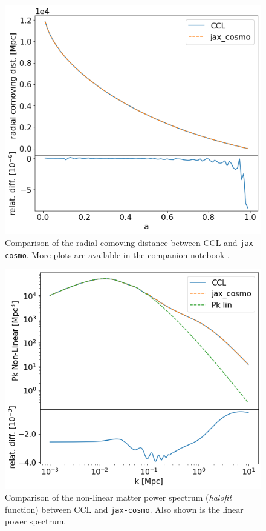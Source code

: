 \documentclass[twocolumn,twocolappendix,nofootinbib,iop]{openjournal}
\newcommand{\nblink}[1]{\href{https://github.com/DifferentiableUniverseInitiative/jax-cosmo-paper/blob/master/notebooks/#1.ipynb}{\faFileCodeO}}
\newcommand{\jaxcosmo}{\texttt{jax-cosmo}}
\begin{document}
\begin{figure}
    \centering
    \includegraphics[width=\columnwidth]{figures/comp_radial_com_dist.png}
    \caption{Comparison of the radial comoving distance between CCL and \jaxcosmo. More plots are available in the  companion notebook \nblink{CCL_comparison}.} 
    \label{fig:chi_comparison}
\end{figure}
\begin{figure}
    \centering
    \includegraphics[width=\columnwidth]{figures/halofit_pk.png}
    \caption{Comparison of the non-linear matter power spectrum (\textit{halofit} function) between CCL and \jaxcosmo. Also shown is the linear power spectrum.}     \label{fig:halofit_comparison}
\end{figure}
\end{document}
